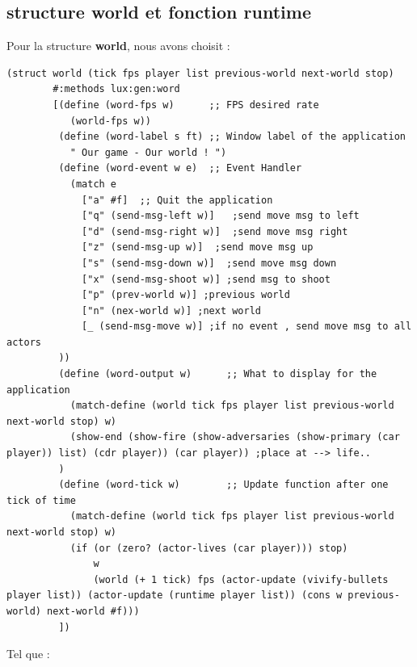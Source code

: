 \documentclass[a4paper]{article}
\begin{document}
\subsection{structure world et fonction runtime} \label{world}
Pour la structure \textbf{world}, nous avons choisit :
\begin{lstlisting}
(struct world (tick fps player list previous-world next-world stop)
        #:methods lux:gen:word
        [(define (word-fps w)      ;; FPS desired rate
           (world-fps w))
         (define (word-label s ft) ;; Window label of the application
           " Our game - Our world ! ")
         (define (word-event w e)  ;; Event Handler
           (match e
             ["a" #f]  ;; Quit the application
	         ["q" (send-msg-left w)]   ;send move msg to left
             ["d" (send-msg-right w)]  ;send move msg right
             ["z" (send-msg-up w)]  ;send move msg up
             ["s" (send-msg-down w)]  ;send move msg down
             ["x" (send-msg-shoot w)] ;send msg to shoot
             ["p" (prev-world w)] ;previous world
             ["n" (nex-world w)] ;next world
             [_ (send-msg-move w)] ;if no event , send move msg to all actors
         ))
         (define (word-output w)      ;; What to display for the application
           (match-define (world tick fps player list previous-world next-world stop) w)
           (show-end (show-fire (show-adversaries (show-primary (car player)) list) (cdr player)) (car player)) ;place at --> life..
         )
         (define (word-tick w)        ;; Update function after one tick of time
           (match-define (world tick fps player list previous-world next-world stop) w)
           (if (or (zero? (actor-lives (car player))) stop)
               w
               (world (+ 1 tick) fps (actor-update (vivify-bullets player list)) (actor-update (runtime player list)) (cons w previous-world) next-world #f))) 
         ])
\end{lstlisting}
Tel que :
\end{document}
